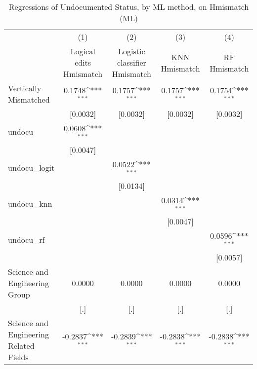 \begin{table}[htbp]\centering
\def\sym#1{\ifmmode^{#1}\else\(^{#1}\)\fi}
\caption{Regressions of Undocumented Status, by ML method, on Hmismatch (ML)}
\begin{tabular}{l*{4}{c}}
\toprule
                    &\multicolumn{1}{c}{(1)}         &\multicolumn{1}{c}{(2)}         &\multicolumn{1}{c}{(3)}         &\multicolumn{1}{c}{(4)}         \\
                    &Logical edits Hmismatch         &Logistic classifier Hmismatch         &KNN Hmismatch         &RF Hmismatch         \\
\midrule
Vertically Mismatched&      0.1748\sym{***}&      0.1757\sym{***}&      0.1757\sym{***}&      0.1754\sym{***}\\
                    &    [0.0032]         &    [0.0032]         &    [0.0032]         &    [0.0032]         \\
\addlinespace
undocu              &      0.0608\sym{***}&                     &                     &                     \\
                    &    [0.0047]         &                     &                     &                     \\
\addlinespace
undocu\_logit        &                     &      0.0522\sym{***}&                     &                     \\
                    &                     &    [0.0134]         &                     &                     \\
\addlinespace
undocu\_knn          &                     &                     &      0.0314\sym{***}&                     \\
                    &                     &                     &    [0.0047]         &                     \\
\addlinespace
undocu\_rf           &                     &                     &                     &      0.0596\sym{***}\\
                    &                     &                     &                     &    [0.0057]         \\
\addlinespace
Science and Engineering Group&      0.0000         &      0.0000         &      0.0000         &      0.0000         \\
                    &         [.]         &         [.]         &         [.]         &         [.]         \\
\addlinespace
Science and Engineering Related Fields&     -0.2837\sym{***}&     -0.2839\sym{***}&     -0.2838\sym{***}&     -0.2838\sym{***}\\

\end{tabular}
\end{table}
